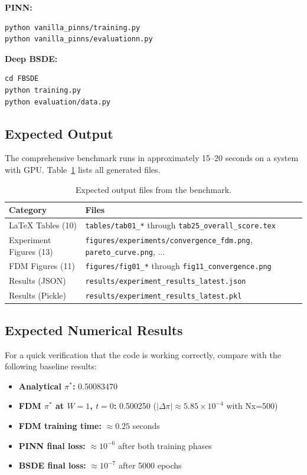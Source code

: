 \documentclass[12pt,a4paper]{article}
\begin{document}
\begin{appendices}
\textbf{PINN:}
\begin{verbatim}
python vanilla_pinns/training.py
python vanilla_pinns/evaluationn.py
\end{verbatim}

\textbf{Deep BSDE:}
\begin{verbatim}
cd FBSDE
python training.py
python evaluation/data.py
\end{verbatim}

\subsection{Expected Output}

The comprehensive benchmark runs in approximately 15--20 seconds on a system with GPU. Table~\ref{tab:expected_outputs} lists all generated files.

\begin{table}[H]
\centering
\caption{Expected output files from the benchmark.}
\label{tab:expected_outputs}
\begin{tabular}{ll}
\toprule
\textbf{Category} & \textbf{Files} \\
\midrule
LaTeX Tables (10) & \texttt{tables/tab01\_*} through \texttt{tab25\_overall\_score.tex} \\
Experiment Figures (13) & \texttt{figures/experiments/convergence\_fdm.png}, \texttt{pareto\_curve.png}, $\ldots$ \\
FDM Figures (11) & \texttt{figures/fig01\_*} through \texttt{fig11\_convergence.png} \\
Results (JSON) & \texttt{results/experiment\_results\_latest.json} \\
Results (Pickle) & \texttt{results/experiment\_results\_latest.pkl} \\
\bottomrule
\end{tabular}
\end{table}

\subsection{Expected Numerical Results}

For a quick verification that the code is working correctly, compare with the following baseline results:

\begin{itemize}
    \item \textbf{Analytical $\pi^*$:} 0.50083470
    \item \textbf{FDM $\pi^*$ at $W=1$, $t=0$:} 0.500250 ($|\Delta\pi| \approx 5.85 \times 10^{-4}$ with Nx=500)
    \item \textbf{FDM training time:} $\approx 0.25$ seconds
    \item \textbf{PINN final loss:} $\approx 10^{-6}$ after both training phases
    \item \textbf{BSDE final loss:} $\approx 10^{-7}$ after 5000 epochs
\end{itemize}


\end{appendices}
\end{document}
